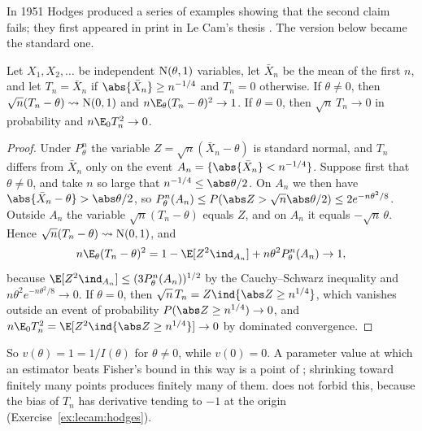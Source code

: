 \begin{refsection}
In 1951 Hodges produced a series of examples showing that the second claim fails; they first appeared in print in Le Cam's thesis \parencite[Section~1]{LeCam1953}. The version below became the standard one.

\begin{proposition}\label{prop:lecam:hodges}
Let $X_1,X_2,\dots$ be independent $\mathrm{N}(\theta,1)$ variables, let $\bar X_n$ be the mean of the first $n$, and let $T_n=\bar X_n$ if $\abs{\bar X_n}\ge n^{-1/4}$ and $T_n=0$ otherwise. If $\theta\ne0$, then $\sqrt n(T_n-\theta)\rightsquigarrow\mathrm{N}(0,1)$ and $n\E_\theta(T_n-\theta)^2\to1$. If $\theta=0$, then $\sqrt n\,T_n\to0$ in probability and $n\E_0T_n^2\to0$.
\end{proposition}

\begin{proof}
Under $P_\theta^n$ the variable $Z=\sqrt n(\bar X_n-\theta)$ is standard normal, and $T_n$ differs from $\bar X_n$ only on the event $A_n=\{\abs{\bar X_n}<n^{-1/4}\}$. Suppose first that $\theta\ne0$, and take $n$ so large that $n^{-1/4}\le\abs\theta/2$. On $A_n$ we then have $\abs{\bar X_n-\theta}>\abs\theta/2$, so $P_\theta^n(A_n)\le P(\abs Z>\sqrt n\abs\theta/2)\le2e^{-n\theta^2/8}$. Outside $A_n$ the variable $\sqrt n(T_n-\theta)$ equals $Z$, and on $A_n$ it equals $-\sqrt n\,\theta$. Hence $\sqrt n(T_n-\theta)\rightsquigarrow\mathrm{N}(0,1)$, and
\[
  n\E_\theta(T_n-\theta)^2=1-\E[Z^2\ind_{A_n}]+n\theta^2P^n_\theta(A_n)\to1,
\]
because $\E[Z^2\ind_{A_n}]\le(3P^n_\theta(A_n))^{1/2}$ by the Cauchy--Schwarz inequality and $n\theta^2e^{-n\theta^2/8}\to0$. If $\theta=0$, then $\sqrt n\,T_n=Z\ind\{\abs Z\ge n^{1/4}\}$, which vanishes outside an event of probability $P(\abs Z\ge n^{1/4})\to0$, and $n\E_0T_n^2=\E[Z^2\ind\{\abs Z\ge n^{1/4}\}]\to0$ by dominated convergence.
\end{proof}

So $v(\theta)=1=1/I(\theta)$ for $\theta\ne0$, while $v(0)=0$. A parameter value at which an estimator beats Fisher's bound in this way is a point of ; shrinking toward finitely many points produces finitely many of them.  does not forbid this, because the bias of $T_n$ has derivative tending to $-1$ at the origin (Exercise~\ref{ex:lecam:hodges}).


\end{refsection}
